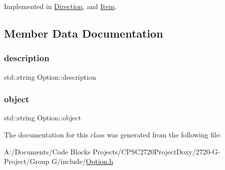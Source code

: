 Implemented in \mbox{\hyperlink{class_direction_aa2af9a792292868d283537fc94469894}{Direction}}, and \mbox{\hyperlink{class_item_a452e4e30bc473c454af2e635fce18db6}{Item}}.



\subsection{Member Data Documentation}
\mbox{\label{class_option_a254f3009a726b0d5e6200b1daa4b163c}} 
\subsubsection{\texorpdfstring{description}{description}}
{\footnotesize\ttfamily std\+::string Option\+::description\hspace{0.3cm}{\ttfamily [protected]}}

\mbox{\label{class_option_a20f3dafc9968fd4868a7ea1d8c40a6b2}} 
\subsubsection{\texorpdfstring{object}{object}}
{\footnotesize\ttfamily std\+::string Option\+::object\hspace{0.3cm}{\ttfamily [protected]}}



The documentation for this class was generated from the following file\+:\begin{DoxyCompactItemize}
\item 
A\+:/\+Documents/\+Code Blocks Projects/\+C\+P\+S\+C2720\+Project\+Doxy/2720-\/\+G-\/\+Project/\+Group G/include/\mbox{\hyperlink{_option_8h}{Option.\+h}}\end{DoxyCompactItemize}
